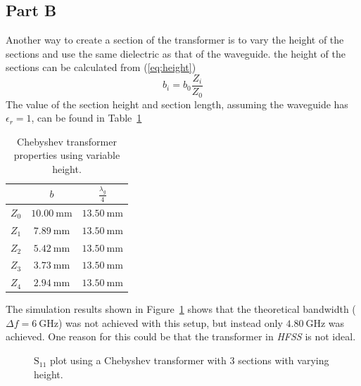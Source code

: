 \documentclass[12pt,a4paper]{article}
\begin{document}
\subsection{Part B}\label{sec:1b}
Another way to create a section of the transformer is to vary the height of the sections and use the same dielectric as that of the waveguide. the height of the sections can be calculated from (\ref{eq:height})
\begin{equation}
  b_i=b_0\frac{Z_i}{Z_0}
  \label{eq:height}
\end{equation}
The value of the section height and section length, assuming the waveguide has $\epsilon_r=1$, can be found in Table~\ref{tab:height}
\begin{table}
  \centering
  \caption{Chebyshev transformer properties using variable height.}
  \begin{tabular}{|c|c|c|}\hline
     & $b$ & $\frac{\lambda_g}{4}$ \\ \hline
    $Z_0$ & $\SI{10.00}{\milli\metre}$ & $\SI{13.50}{\milli\metre}$ \\ \hline
    $Z_1$ & $\SI{7.89}{\milli\metre}$ & $\SI{13.50}{\milli\metre}$ \\ \hline
    $Z_2$ & $\SI{5.42}{\milli\metre}$ & $\SI{13.50}{\milli\metre}$ \\ \hline
    $Z_3$ & $\SI{3.73}{\milli\metre}$ & $\SI{13.50}{\milli\metre}$ \\ \hline
    $Z_4$ & $\SI{2.94}{\milli\metre}$ & $\SI{13.50}{\milli\metre}$ \\ \hline
  \end{tabular}
  \label{tab:height}
\end{table}
The simulation results shown in Figure~\ref{fig:var_dim_s11} shows that the theoretical bandwidth ($\Delta f=\SI{6}{\giga\hertz}$) was not achieved with this setup, but instead only $\SI{4.80}{\giga\hertz}$ was achieved. One reason for this could be that the transformer in \textit{HFSS} is not ideal.

\begin{figure}
  \centering
  \noindent{}
  \caption{$\text{S}_{11}$ plot using a Chebyshev transformer with 3 sections with varying height.}
  \label{fig:var_dim_s11}
\end{figure}
\end{document}
